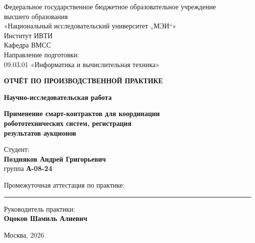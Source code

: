 \documentclass[14pt,a4paper]{extarticle}
\begin{document}
	
	\begin{titlepage}
		\centering
		\small
		Федеральное государственное бюджетное образовательное учреждение\\
		высшего образования\\
		«Национальный исследовательский университет „МЭИ“»\\[0.9cm]
		Институт ИВТИ\\
		Кафедра ВМСС\\
		Направление подготовки:\\
		09.03.01 «Информатика и вычислительная техника»
		
		\vspace{3.5cm}
		
		{\Large\bfseries ОТЧЁТ ПО ПРОИЗВОДСТВЕННОЙ ПРАКТИКЕ\par}
		\vspace{0.4cm}
		{\normalsize\bfseries Научно-исследовательская работа\par}
		
		\vspace{1.9cm}
		
		{\large\bfseries
			Применение смарт-контрактов для координации\\
			робототехнических систем, регистрация\\
			результатов аукционов\par}
		
		\vfill
		
		\begin{flushright}
			\begin{minipage}{0.58\textwidth}
				\raggedright
				Студент:\\[2pt]
				\textbf{Поздняков Андрей Григорьевич}\\[2pt]
				группа \textbf{А-08-24}
				
				\vspace{0.9cm}
				
				Промежуточная аттестация по практике:\\
				\rule{3.5cm}{0.4pt}
				
				\vspace{0.9cm}
				
				Руководитель практики:\\[2pt]
				\textbf{Оцоков Шамиль Алиевич}
			\end{minipage}
		\end{flushright}
		
		\vfill
		
		Москва, 2026
	\end{titlepage}
	
\end{document}
